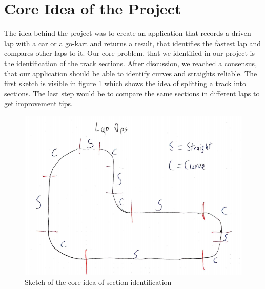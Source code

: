 \section{Core Idea of the Project}
The idea behind the project was to create an application that records a driven lap with a car or a go-kart and returns a result, that identifies the fastest lap and compares other laps to it. Our core problem, that we identified in our project is the identification of the track sections. After discussion, we reached a consensus, that our application should be able to identify curves and straights reliable. The first sketch is visible in figure \ref{sketchLapOps} which shows the idea of splitting a track into sections. The last step would be to compare the same sections in different laps to get improvement tips.

\begin{figure}[H]
	\centering
	\includegraphics[scale= 0.6]{Pictures/LapOpsSkizze.png}
	\caption{Sketch of the core idea of section identification}
	\label{sketchLapOps}
\end{figure}
